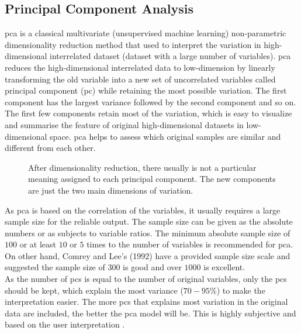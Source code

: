 \subsection{Principal Component Analysis}
\label{sec:pca}
\gls{pca} is a classical multivariate (unsupervised machine learning) non-parametric dimensionality reduction method that used to interpret the variation in high-dimensional interrelated dataset (dataset with a large number of variables). \gls{pca} reduces the high-dimensional interrelated data to low-dimension by linearly transforming the old variable into a new set of uncorrelated variables called principal component (\gls{pc}) while retaining the most possible variation. The first component has the largest variance followed by the second component and so on. The first few components retain most of the variation, which is easy to visualize and summarise the feature of original high-dimensional datasets in low-dimensional space. \gls{pca} helps to assess which original samples are similar and different from each other. \\

\begin{figure}[htbp]
	\caption[\gls{pca} - Biplot.]{After dimensionality reduction, there usually is not a particular meaning assigned to each principal component. The new components are just the two main dimensions of variation.}\label{fig:bipca}
\end{figure}

\noindent As \gls{pca} is based on the correlation of the variables, it usually requires a large sample size for the reliable output. The sample size can be given as the absolute numbers or as subjects to variable ratios. The minimum absolute sample size of $100$ or at least $10$ or $5$ times to the number of variables is recommended for \gls{pca}. On other hand, Comrey and Lee’s (1992) have a provided sample size scale and suggested the sample size of $300$ is good and over $1000$ is excellent. \\

\noindent As the number of \glspl{pc} is equal to the number of original variables, only the \glspl{pc} should be kept, which explain the most variance ($70-95\%$) to make the interpretation easier. The more \glspl{pc} that explains most variation in the original data are included, the better the \gls{pca} model will be. This is highly subjective and based on the user interpretation \cite[]{cangelosi2007component}. \\

